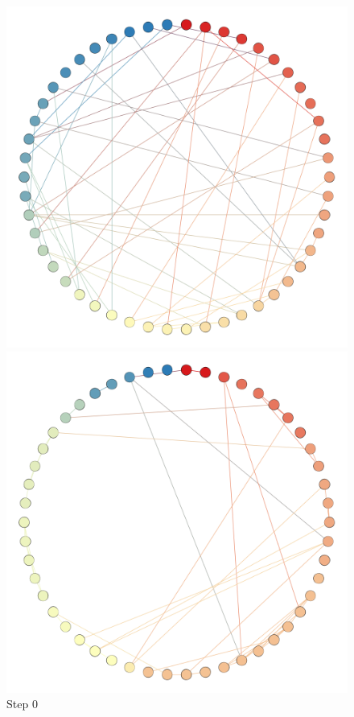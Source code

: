 \documentclass[11pt]{article}
\begin{document}
\begin{figure}[!htb]
\centering
  \includegraphics[width=0.95\linewidth]{images/Evolutions/Holme0.png}
  \caption*{Step 0}
\endminipage\hfill
{}
\centering
  \includegraphics[width=0.95\linewidth]{images/Evolutions/Holme200.png}

\end{figure}
\end{document}

